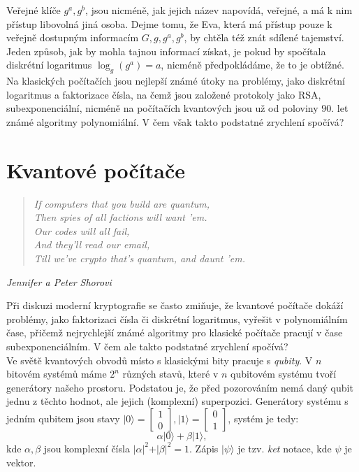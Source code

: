 \documentclass [12pt]{report}
\begin{document}
Veřejné klíče $g^a,g^b$, jsou nicméně, jak jejich název napovídá, veřejné, a má k nim přístup libovolná jiná osoba. Dejme tomu, že Eva, která má přístup pouze k veřejně dostupným informacím $G,g,g^a,g^b$, by chtěla též znát sdílené tajemství. Jeden způsob, jak by mohla tajnou informací získat, je pokud by spočítala diskrétní logaritmus $\log_g(g^a) = a$, nicméně předpokládáme, že to je obtížné. Na klasických počítačích jsou nejlepší známé útoky na problémy, jako diskrétní logaritmus a faktorizace čísla, na čemž jsou založené protokoly jako RSA, subexponenciální, nicméně na počítačích kvantových jsou už od poloviny $90$. let známé algoritmy polynomiální. V čem však takto podstatné zrychlení spočívá?

\section{Kvantové počítače}
\begin{center}
\begin{verse}
\qquad \textit{If computers that you build are quantum,}\\
\qquad \textit{Then spies of all factions will want 'em.}\\
\qquad \textit{Our codes will all fail,}\\
\qquad \textit{And they'll read our email,}\\
\qquad \textit{Till we've crypto that's quantum, and daunt 'em. }
\end{verse}
\hfill \textit{Jennifer a Peter Shorovi}
\end{center}

Při diskuzi moderní kryptografie se často zmiňuje, že kvantové počítače dokáží problémy, jako faktorizaci čísla či diskrétní logaritmus, vyřešit v polynomiálním čase, přičemž nejrychlejší známé algoritmy pro klasické počítače pracují v čase subexponenciálním.  V čem ale takto podstatné zrychlení spočívá?\\

Ve světě kvantových obvodů místo s klasickými bity pracuje s \textit{qubity}. V $n$ bitovém systémů máme $2^n$ různých stavů, které v $n$ qubitovém systému tvoří generátory našeho prostoru. Podstatou je, že před pozorováním nemá daný qubit jednu z těchto hodnot, ale jejich (komplexní) superpozici. Generátory systému s jedním qubitem jsou stavy $\vert 0 \rangle = \begin{bmatrix}
1 \\
0
\end{bmatrix}, \vert 1 \rangle = \begin{bmatrix}
0 \\
1
\end{bmatrix}$, systém je tedy:
\begin{equation*}
\alpha \vert 0 \rangle + \beta \vert 1 \rangle,
\end{equation*}
kde $\alpha, \beta$ jsou komplexní čísla $\vert \alpha \vert ^2 + \vert \beta \vert ^2 = 1$. Zápis $\vert \psi \rangle$ je tzv. \textit{ket} notace, kde $\psi$ je vektor.\\
\end{document}
